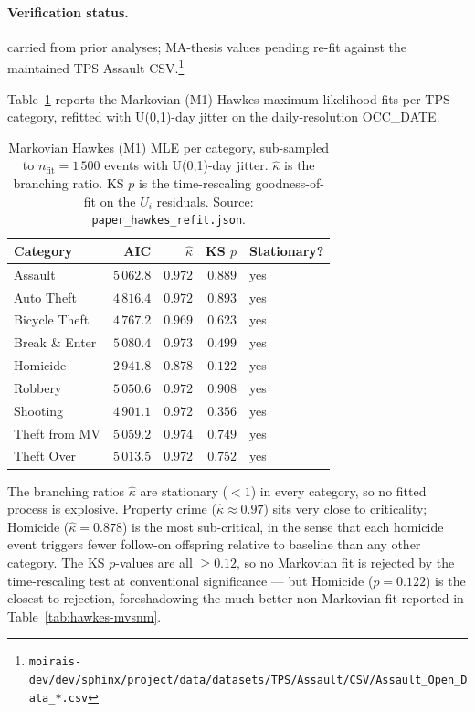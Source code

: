 \documentclass[article,shortnames,nojss]{jss}
\begin{document}
\paragraph*{Verification status.}
carried from prior analyses; MA-thesis values pending re-fit against the maintained TPS Assault CSV.\footnote{\texttt{moirais-dev/dev/sphinx/project/data/datasets/TPS/Assault/CSV/Assault\_Open\_Data\_*.csv}}

Table~\ref{tab:hawkes-markovian} reports the Markovian (M1) Hawkes
maximum-likelihood fits per TPS category, refitted with U(0,1)-day
jitter on the daily-resolution OCC\_DATE.

\begin{table}[h]
\centering\small
\caption{Markovian Hawkes (M1) MLE per category, sub-sampled to
$n_{\mathrm{fit}} = 1\,500$ events with U(0,1)-day jitter.
$\hat\kappa$ is the branching ratio.  KS $p$ is the time-rescaling
goodness-of-fit on the $U_i$ residuals.  Source:
\texttt{paper\_hawkes\_refit.json}.}\label{tab:hawkes-markovian}
\begin{tabular}{lrrrl}
\toprule
Category & AIC & $\hat\kappa$ & KS $p$ & Stationary?\\\midrule
Assault                       & $5\,062.8$ & $0.972$ & $0.889$ & yes\\
Auto Theft                    & $4\,816.4$ & $0.972$ & $0.893$ & yes\\
Bicycle Theft                 & $4\,767.2$ & $0.969$ & $0.623$ & yes\\
Break \& Enter                & $5\,080.4$ & $0.973$ & $0.499$ & yes\\
Homicide                      & $2\,941.8$ & $0.878$ & $0.122$ & yes\\
Robbery                       & $5\,050.6$ & $0.972$ & $0.908$ & yes\\
Shooting                      & $4\,901.1$ & $0.972$ & $0.356$ & yes\\
Theft from MV                 & $5\,059.2$ & $0.974$ & $0.749$ & yes\\
Theft Over                    & $5\,013.5$ & $0.972$ & $0.752$ & yes\\
\bottomrule
\end{tabular}
\end{table}

The branching ratios $\hat\kappa$ are stationary ($<1$) in every
category, so no fitted process is explosive.  Property crime
($\hat\kappa\approx 0.97$) sits very close to criticality;
Homicide ($\hat\kappa = 0.878$) is the most sub-critical, in the
sense that each homicide event triggers fewer follow-on offspring
relative to baseline than any other category.  The KS $p$-values
are all $\ge 0.12$, so no Markovian fit is rejected by the
time-rescaling test at conventional significance --- but
Homicide ($p=0.122$) is the closest to rejection, foreshadowing the
much better non-Markovian fit reported in
Table~\ref{tab:hawkes-mvsnm}.
\end{document}
